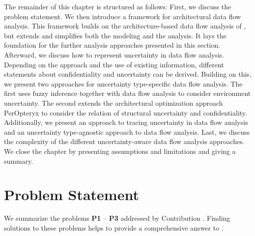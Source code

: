 \RQthree

The remainder of this chapter is structured as follows:
First, we discuss the problem statement.
We then introduce a framework for architectural data flow analysis.
This framework builds on the architecture-based data flow analysis of \textcite{seifermann_architectural_2022,seifermann_identifying_2021}, but extends and simplifies both the modeling and the analysis.
It lays the foundation for the further analysis approaches presented in this section.
Afterward, we discuss how to represent uncertainty in data flow analysis.
Depending on the approach and the use of existing information, different statements about confidentiality and uncertainty can be derived.
Building on this, we present two approaches for uncertainty type-specific data flow analysis.
The first uses fuzzy inference \cite{klir_fuzzy_1995} together with data flow analysis to consider environment uncertainty.
The second extends the architectural optimization approach PerOpteryx \cite{koziolek_peropteryx_2011,koziolek_automated_2011} to consider the relation of structural uncertainty and confidentiality.
Additionally, we present an approach to tracing uncertainty in data flow analysis and an uncertainty type-agnostic approach to data flow analysis.
Last, we discuss the complexity of the different uncertainty-aware data flow analysis approaches.
We close the chapter by presenting assumptions and limitations and giving a summary.






\section{Problem Statement}%
\label{sec:confidentialityanalysis:problem}

We summarize the problems \textbf{P1} -- \textbf{P3} addressed by Contribution .
Finding solutions to these problems helps to provide a comprehensive answer to .

